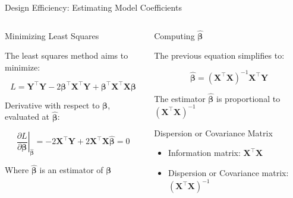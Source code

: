 \documentclass[10pt, compress, aspectratio=169, xcolor={table,usenames,dvipsnames}]{beamer}
\begin{document}
\begin{frame}[label={sec:org0739d0a}]{Design Efficiency: Estimating Model Coefficients}
\addtocounter{framenumber}{-1}
\begin{columns}
\begin{column}{0.5\columnwidth}
\begin{block}{Minimizing Least Squares}
\vspace{.2cm}

The \alert{least squares method} aims to minimize:
\vspace{-.8cm}
\begin{center}
\begin{equation*}
L = \bm{Y}^{\intercal}\bm{Y} - 2\bm{\beta}^{\intercal}\bm{X}^{\intercal}\bm{Y} +
\bm{\beta}^{\intercal}\bm{X}^{\intercal}\bm{X\beta}
\end{equation*}
\end{center}

\alert{Derivative} with respect to \(\bm{\beta}\), \alert{evaluated} at \(\bm{\hat{\beta}}\):
\vspace{-.7cm}
\begin{center}
\begin{equation*}
\left. \dfrac{\partial{}L}{\partial{}\bm{\beta}}\right|_{\bm{\hat{\beta}}} =
- 2\bm{X}^{\intercal}\bm{Y} + 2\bm{X}^{\intercal}\bm{X\hat{\beta}} = 0
\end{equation*}
\end{center}
Where \(\bm{\hat{\beta}}\) is an \alert{estimator} of \(\bm{\beta}\)
\end{block}
\end{column}
\begin{column}{0.5\columnwidth}
\begin{block}{Computing \(\bm{\hat{\beta}}\)}
\vspace{.2cm}

The previous equation simplifies to:
\vspace{-.8cm}
\begin{center}
\begin{equation*}
\bm{\hat{\beta}} = \left(\bm{X}^{\intercal}\bm{X}\right)^{-1}\bm{X}^{\intercal}\bm{Y}
\end{equation*}
\end{center}

\vspace{-.4cm}
\begin{center}
\colorbox{Accent!25}{The estimator \(\bm{\hat{\beta}}\) is proportional to \(\left(\bm{X}^{\intercal}\bm{X}\right)^{-1}\)}
\end{center}
\vspace{.2cm}
\begin{block}{Dispersion or Covariance Matrix}
\begin{itemize}
\item \alert{Information matrix}: \(\bm{X}^{\intercal}\bm{X}\)
\item \alert{Dispersion} or \alert{Covariance matrix}: \(\left(\bm{X}^{\intercal}\bm{X}\right)^{-1}\)
\end{itemize}
\end{block}
\end{block}
\end{column}
\end{columns}
\end{frame}
\end{document}
